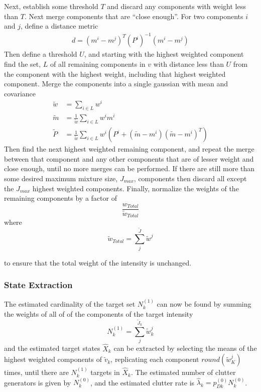 \documentclass{article}
\begin{document}
Next, establish some threshold $T$ and discard any components with weight less than $T$. Next merge components that are ``close enough''. For two components $i$ and $j$, define a distance metric
\begin{align}
  \label{eq:dist}
  d = (m^i - m^j)^T(P^i)^{-1}(m^i - m^j)
\end{align}
Then define a threshold $U$, and starting with the highest weighted component find the set, $L$ of all remaining components in $v$ with distance less than $U$ from the component with the highest weight, including that highest weighted component. Merge the components into a single gaussian with mean and covariance
\begin{align}
  \label{eq:merged}
  \tilde{w} &= \sum_{i \in L}w^i\\
  \tilde{m} &= \frac{1}{\tilde{w}}\sum_{i \in L}w^im^i\\
  \tilde{P} &= \frac{1}{\tilde{w}}\sum_{i \in L}w^i(P^i + (\tilde{m} - m^i)(\tilde{m} - m^i)^T)
\end{align}
Then find the next highest weighted remaining component, and repeat the merge between that component and any other components that are of lesser weight and close enough, until no more merges can be performed. If there are still more than some desired maximum mixture size, $J_{max}$, components then discard all except the $J_{max}$ highest weighted components. Finally, normalize the weights of the remaining components by a factor of
\begin{equation}
  \label{eq:wnorm}
  \frac{w_{Total}}{\tilde{w}_{Total}}
\end{equation}
where
\begin{equation}
  \label{eq:wtild_total}
  \tilde{w}_{Total} = \sum_j^{\tilde{J}}\tilde{w}^j
\end{equation}

to ensure that the total weight of the intensity is unchanged.

\subsubsection*{State Extraction}
The estimated cardinality of the target set $N_k^{(1)}$ can now be found by summing the weights of all of of the components of the target intensity
\begin{equation}
  \label{eq:N1k}
  N_k^{(1)} = \sum_j^{\tilde{J}_k}\tilde{w}_k^j
\end{equation}
and the estimated target states $\hat{X}_k$ can be extracted by selecting the means of the highest weighted components of $\tilde{v}_k$, replicating each component $round(\tilde{w}_K^j)$ times, until there are $N_k^{(1)}$ targets in $\hat{X}_k$. The estimated number of clutter generators is given by $N_k^{(0)}$, and the estimated clutter rate is $\hat{\lambda}_k = p_{Dk}^{(0)}N_k^{(0)}$.
\end{document}
